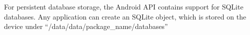 For persistent database storage, the Android API contains
support for SQLite databases. Any application can create
an SQLite object, which is stored on the device under
``/data/data/package\_name/databases''
